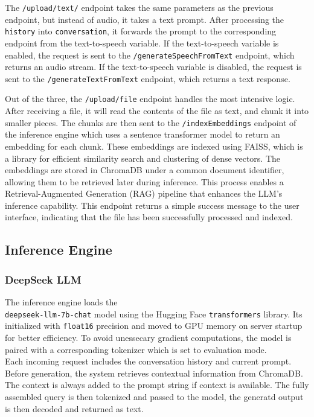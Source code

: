 \documentclass[twocolumn]{article}
\begin{document}
The \verb|/upload/text/| endpoint takes the same parameters as the previous endpoint, but instead of audio, it takes a text prompt. After processing the \verb|history| into \verb|conversation|, it forwards the prompt to the corresponding endpoint from the text-to-speech variable. If the text-to-speech variable is enabled, the request is sent to the \verb|/generateSpeechFromText| endpoint, which returns an audio stream. If the text-to-speech variable is disabled, the request is sent to the \verb|/generateTextFromText| endpoint, which returns a text response.

Out of the three, the \verb|/upload/file| endpoint handles the most intensive logic. After receiving a file, it will read the contents of the file as text, and chunk it into smaller pieces. The chunks are then sent to the \verb|/indexEmbeddings| endpoint of the inference engine which uses a sentence transformer model to return an embedding for each chunk. These embeddings are indexed using FAISS, which is a library for efficient similarity search and clustering of dense vectors. The embeddings are stored in ChromaDB\cite{chromadb2023} under a common document identifier, allowing them to be retrieved later during inference. This process enables a Retrieval-Augmented Generation (RAG) pipeline that enhances the LLM's inference capability. This endpoint returns a simple success message to the user interface, indicating that the file has been successfully processed and indexed.

\subsection{Inference Engine}

\subsubsection{DeepSeek LLM}
The inference engine loads the\\\texttt{deepseek-llm-7b-chat}\cite{deepseek7bchat} model using the Hugging Face \texttt{transformers} library. Its initialized with \texttt{float16} precision and moved to GPU memory on server startup for better efficiency. To avoid unessecary gradient computations, the model is paired with a corresponding tokenizer which is set to evaluation mode.\\
Each incoming request includes the conversation history and current prompt. Before generation, the system retrieves contextual information from ChromaDB. The context is always added to the prompt string if context is available. The fully assembled query is then tokenized and passed to the model, the generatd output is then decoded and returned as text.
\end{document}

